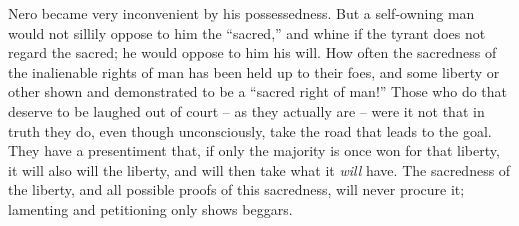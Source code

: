 \documentclass[12pt,a4paper]{book}
\begin{document}
Nero became very inconvenient by his possessedness. But a self-owning man 
would not sillily oppose to him the ``sacred,'' and whine if the tyrant does 
not regard the sacred; he would oppose to him his will. How often the 
sacredness of the inalienable rights of man has been held up to their foes, 
and some liberty or other shown and demonstrated to be a ``sacred right of 
man!'' Those who do that deserve to be laughed out of court -- as they 
actually are -- were it not that in truth they do, even though unconsciously, 
take the road that leads to the goal. They have a presentiment that, if only 
the majority is once won for that liberty, it will also will the liberty, and 
will then take what it \textit{will} have. The sacredness of the liberty, and 
all possible proofs of this sacredness, will never procure it; lamenting and 
petitioning only shows beggars.
\end{document}
